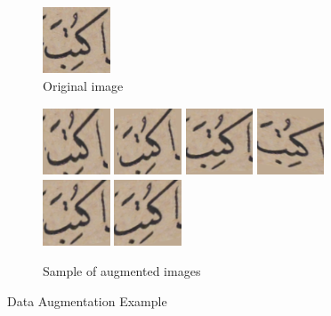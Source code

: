 \begin{figure}[!htb]
     \centering
     \begin{subfigure}[b]{0.2\textwidth}
         \centering
         \includegraphics[width=2cm, height=2cm]{images/original.png}
         \caption{Original image}
         \label{fig:Original image}
     \end{subfigure}
     \hfill
     \begin{subfigure}[b]{0.8\textwidth}
         \centering
            \includegraphics[width=2cm, height=2cm]{images/augmented_0.png}
            \includegraphics[width=2cm, height=2cm]{images/augmented_1.png}
            \includegraphics[width=2cm, height=2cm]{images/augmented_2.png}
            \includegraphics[width=2cm, height=2cm]{images/augmented_3.png}
            \includegraphics[width=2cm, height=2cm]{images/augmented_5.png}
            \includegraphics[width=2cm, height=2cm]{images/augmented_6.png}
         \caption{Sample of augmented images }
         \label{fig:Sample of augmented images}
     \end{subfigure}
        \caption{Data Augmentation Example}
        \label{fig:Data Augmentation Example}
\end{figure}



